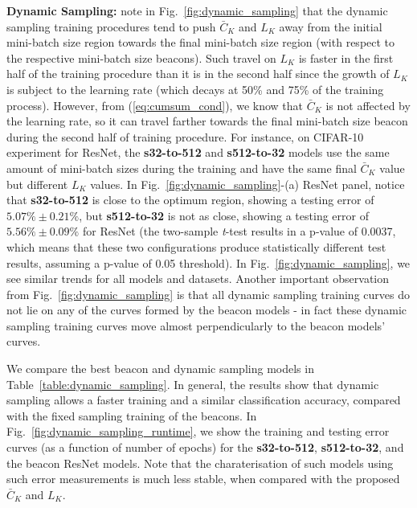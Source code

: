 \documentclass[10pt,journal,compsoc]{IEEEtran}
\begin{document}
{\bf Dynamic Sampling: }
note in Fig.~\ref{fig:dynamic_sampling} that the dynamic sampling training procedures tend to push $\bar{C}_K$ and $L_K$ away from the initial mini-batch size region towards the final mini-batch size region (with respect to the respective mini-batch size beacons).
Such travel on $L_K$ is faster in the first half of the training procedure than it is in the second half since the growth of $L_K$ is subject to the learning rate (which decays at 50\% and 75\% of the training process).
However, from (\ref{eq:cumsum_cond}), we know that $\bar{C}_K$ is not affected by the learning rate, so it can travel farther towards the final mini-batch size beacon during the second half of training procedure.  For instance, on CIFAR-10 experiment for ResNet, the {\bf s32-to-512} and {\bf s512-to-32} models use the same amount of mini-batch sizes during the training and have the same final $\bar{C}_K$ value but different $L_K$ values.
In Fig.~\ref{fig:dynamic_sampling}-(a) ResNet panel, notice that {\bf s32-to-512} is close to the optimum region, showing a testing error of $5.07\% \pm 0.21\%$, but {\bf s512-to-32} is not as close, showing a testing error of $5.56\% \pm 0.09\%$ for ResNet (the two-sample \textit{t}-test results in a p-value of 0.0037, which means that these two configurations produce statistically different test results, assuming a p-value of 0.05 threshold).  In Fig.~\ref{fig:dynamic_sampling}, we see similar trends for all models and datasets.
Another important observation from Fig.~\ref{fig:dynamic_sampling} is that all dynamic sampling training curves do not lie on any of the curves formed by the beacon models - in fact these dynamic sampling training curves move almost perpendicularly to the beacon models' curves.

We compare the best beacon and dynamic sampling models in Table~\ref{table:dynamic_sampling}.  In general, the results show that dynamic sampling allows a faster training and a similar classification accuracy, compared with the fixed sampling training of the beacons. 
In Fig.~\ref{fig:dynamic_sampling_runtime}, we show the training and testing error curves (as a function of number of epochs) for the {\bf s32-to-512}, {\bf s512-to-32}, and the beacon ResNet models.  Note that the charaterisation of such models using such error measurements is much less stable, when compared with the proposed $\bar{C}_K$ and $L_K$.
\end{document}
